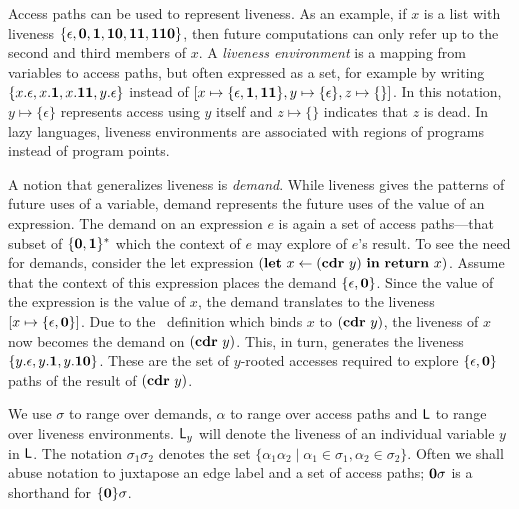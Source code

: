 \documentclass[preprint,9pt]{sigplanconf}
\begin{document}
Access paths can be used to  represent liveness. As an example, if $x$
is  a  list  with  liveness  $\{\epsilon,  \mathbf{0},  \mathbf{1},  \mathbf{1}\mathbf{0},
\mathbf{1}\mathbf{1},  \mathbf{1}\mathbf{1}\mathbf{0}\}$,  then  future computations  can  only
refer up  to the  second and  third members of  $x$.  A  {\em liveness
  environment} is a mapping from  variables to access paths, but often
expressed as  a set,  for example  by writing  $\{x.\epsilon, x.\mathbf{1},
x.\mathbf{1}\mathbf{1},        y.\epsilon\}$        instead        of        $[x
  \mapsto\{\epsilon,\mathbf{1},\mathbf{1}\mathbf{1}\},          y\mapsto\{\epsilon\},
  z\mapsto\{\}]$.    In  this   notation,  $y   \mapsto  \{\epsilon\}$
represents access using $y$ itself and $z \mapsto \{\}$ indicates that
$z$ is dead.  In lazy  languages, liveness environments are associated
with regions of programs instead of program points.

A notion  that generalizes liveness  is {\em demand}.   While liveness
gives the patterns of future uses of a variable, demand represents the
future uses of the value of an expression.  The demand on an expression
$e$   is   again   a   set    of   access   paths---that   subset   of
$\{\mathbf{0},\mathbf{1}\}^\ast$ which the  context of $e$ may  explore of $e$'s
result.   To see  the need  for demands,  consider the  let expression
$(\mbox{$\mathbf{ let}$}~x\leftarrow  (\mbox{$\mathbf{cdr}$}~y)~\mbox{$\mathbf{ in}$}~   \mbox{$\mathbf{ return}$}~x)$.   Assume   that  the
context of this expression places  the demand $\lbrace \epsilon, \mathbf{0}
\rbrace$. Since the  value of the expression is the  value of $x$, the
demand translates to the liveness  $[x \mapsto \lbrace \epsilon, \mathbf{0}
  \rbrace]$.   Due  to  the  \LET\   definition  which  binds  $x$  to
$(\mbox{$\mathbf{cdr}$}~y)$, the liveness of $x$  now becomes the demand on $(\mbox{$\mathbf{cdr}$}~y)$.
This, in  turn, generates  the liveness $\lbrace  y.\epsilon, y.\mathbf{1},
y.\mathbf{1}\mathbf{0}  \rbrace$.   These are  the  set  of $y$-rooted  accesses
required to  explore $\lbrace  \epsilon, \mathbf{0}  \rbrace$ paths  of the
result of $(\mbox{$\mathbf{cdr}$}~y)$.

We use $\sigma$  to range over demands, $\alpha$ to  range over access
paths  and $\mathsf{L}$  to range  over liveness  environments. $\mathsf{L}_y$  will
denote  the liveness  of an  individual  variable $y$  in $\mathsf{L}$.   The
notation $\sigma_1\sigma_2$ denotes  the set $\lbrace \alpha_1\alpha_2
\mid \alpha_1  \in \sigma_1, \alpha_2 \in  \sigma_2\rbrace$.  Often we
shall abuse  notation to juxtapose an  edge label and a  set of access
paths; $\mathbf{0}\sigma$ is a shorthand for $\lbrace\mathbf{0}\rbrace\sigma$.
\end{document}
